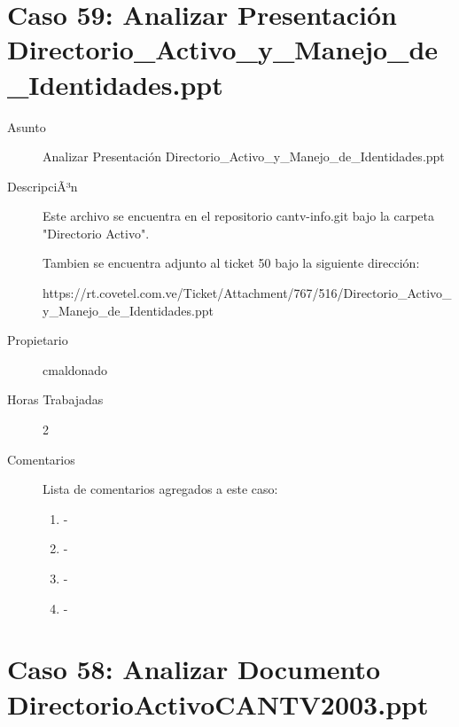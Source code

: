 \section{Caso 59: Analizar Presentación Directorio_Activo_y_Manejo_de_Identidades.ppt }

\begin{description}

\item[Asunto] Analizar Presentación Directorio_Activo_y_Manejo_de_Identidades.ppt\item[DescripciÃ³n] Este archivo se encuentra en el repositorio cantv-info.git bajo la carpeta
"Directorio Activo".

Tambien se encuentra adjunto al ticket 50 bajo la siguiente dirección:

https://rt.covetel.com.ve/Ticket/Attachment/767/516/Directorio_Activo_y_Manejo_de_Identidades.ppt\item[Propietario] cmaldonado\item[Horas Trabajadas] 2

\item[Comentarios] Lista de comentarios agregados a este caso:  
\begin{enumerate}
        \item {\bfseries  } - {\bfseries } \\         \item {\bfseries  } - {\bfseries } \\         \item {\bfseries  } - {\bfseries } \\         \item {\bfseries  } - {\bfseries } \\     \end{enumerate}

\end{description}

\section{Caso 58: Analizar Documento DirectorioActivoCANTV2003.ppt  }

